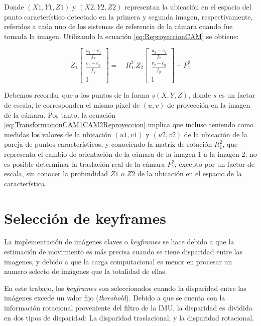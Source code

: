 Donde $(X1, Y1, Z1)$ y $(X2, Y2, Z2)$ representan la ubicación en el espacio del punto característico detectado en la primera y segunda imagen, respectivamente, referidos a cada uno de los sistemas de referencia de la cámara cuando fue tomada la imagen. Utilizando la ecuación \ref{eq:ReproyeccionCAM} se obtiene:


\begin{equation}
{ Z }_{ 1 }\left[ \begin{matrix} \frac { u_{ 1 }-{ c }_{ x } }{ { f }_{ x } }  \\ \frac { { v }_{ 1 }-{ c }_{ y } }{ { f }_{ y } }  \\ 1 \end{matrix} \right] =\quad { R }_{ 1 }^{ 2 }.{ Z }_{ 2 }\left[ \begin{matrix} \frac { u_{ 2 }-{ c }_{ x } }{ { f }_{ x } }  \\ \frac { { v }_{ 2 }-{ c }_{ y } }{ { f }_{ y } }  \\ 1 \end{matrix} \right] +{ P }_{ 1 }^{ 2 }
\label{eq:TransformacionCAM1CAM2Reproyeccion} 
\end{equation}

Debemos recordar que a los puntos de la forma $s (X, Y, Z)$, donde $s$ es un factor de escala, le corresponden el mismo pixel de $(u,v)$ de proyección en la imagen de la cámara. Por tanto, la ecuación \ref{eq:TransformacionCAM1CAM2Reproyeccion} implica que incluso teniendo como medidas los valores de la ubicación  $(u1,v1)$ y $(u2,v2)$ de la ubicación de la pareja de puntos característicos, y conociendo la matriz de rotación ${ R }_{ 1 }^{ 2 }$, que representa el cambio de orientación de la cámara de la imagen 1 a la imagen 2, no es posible determinar la traslación real de la cámara ${ P }_{ 1 }^{ 2 }$, excepto por un factor de escala, sin conocer la profundidad $Z1$ o $Z2$ de la ubicación en el espacio de la característica.


\section{Selección de keyframes}

La implementación de imágenes claves o \textit{keyframes} se hace debido a que la estimación de movimiento es más precisa cuando se tiene disparidad entre las imagenes, y debido a que la carga computacional es menor en procesar un numero selecto de imágenes que la totalidad de ellas.

En este trabajo, los \textit{keyframes} son seleccionados cuando la disparidad entre las imágenes excede un valor fijo (\textit{threshold}). Debido a que se cuenta con la información rotacional proveniente del filtro de la IMU, la disparidad es dividida en dos tipos de disparidad: La disparidad traslacional, y la disparidad rotacional.


